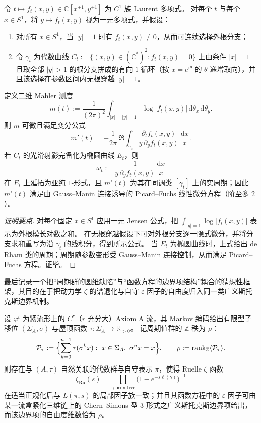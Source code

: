 \begin{theorem}\label{thm:conclusion-leyang-jensen-stokes-variational}
令 \(t\mapsto f_t(x,y)\in\mathbb C[x^{\pm1},y^{\pm1}]\) 为 \(C^1\) 族 Laurent 多项式。
对每个 \(t\) 与每个 \(x\in S^1\)，将 \(y\mapsto f_t(x,y)\) 视为一元多项式，并假设：
\begin{enumerate}
  \item 对所有 \(x\in S^1\)，当 \(|y|=1\) 时有 \(f_t(x,y)\neq 0\)，从而可连续选择外根分支；
  \item 令 \(\gamma_t\) 为代数曲线 \(C_t:=\{(x,y)\in(\mathbb C^*)^2:f_t(x,y)=0\}\) 上由条件 \(|x|=1\) 且取全部 \(|y|>1\) 的根分支拼成的有向 \(1\)-循环（按 \(x=e^{\mathrm i\theta}\) 的 \(\theta\) 递增取向），并且该选择在参数区间内无根穿越 \(|y|=1\)。
\end{enumerate}
定义二维 Mahler 测度
\[
m(t):=\frac1{(2\pi)^2}\int_{|x|=|y|=1}\log|f_t(x,y)|\,\mathrm d\theta_x\,\mathrm d\theta_y.
\]
则 \(m\) 可微且满足变分公式
\[
m'(t)
=-\frac1{2\pi}\,\Re\int_{\gamma_t}\frac{\partial_t f_t(x,y)}{y\,\partial_y f_t(x,y)}\,\frac{\mathrm d x}{x}.
\]
若 \(C_t\) 的光滑射影完备化为椭圆曲线 \(E_t\)，则
\[
\omega_t:=\frac{1}{y\,\partial_y f_t(x,y)}\,\frac{\mathrm d x}{x}
\]
在 \(E_t\) 上延拓为亚纯 \(1\)-形式，且 \(m'(t)\) 为其在同调类 \([\gamma_t]\) 上的实周期；因此 \(m'(t)\) 满足由 Gauss--Manin 连接诱导的 Picard--Fuchs 线性微分方程（阶至多 \(2\)）。
\end{theorem}
\begin{proof}[证明要点]
对每个固定 \(x\in S^1\) 应用一元 Jensen 公式，把 \(\int_{|y|=1}\log|f_t(x,y)|\) 表示为外根模长对数之和。
在无根穿越假设下可对外根分支逐一隐式微分，并将分支求和重写为沿 \(\gamma_t\) 的线积分，得到所示公式。
当 \(E_t\) 为椭圆曲线时，上式给出 de Rham 类的周期；周期随参数变形受 Gauss--Manin 连接控制，从而满足 Picard--Fuchs 方程。证毕。
\end{proof}

最后记录一个把“周期群的圆维缺陷”与“函数方程的边界项结构”耦合的猜想性框架，其目的在于把动力学 \(\zeta\) 的谱退化与自守 \(\varepsilon\)-因子的自由度归入同一类广义斯托克斯边界机制。

\begin{conjecture}\label{conj:conclusion-stokes-boundary-langlands-bridge}
设 \(\varphi^t\) 为紧流形上的 \(C^r\)（\(r\) 充分大）Axiom A 流，其 Markov 编码给出有限型子移位 \((\Sigma_A,\sigma)\) 与屋顶函数 \(\tau:\Sigma_A\to\mathbb R_{>0}\)。
记周期值群的 \(\mathbb Z\)-秩为 \(\rho\)：
\[
\mathcal P_\tau:=\Bigl\{\sum_{k=0}^{n-1}\tau(\sigma^k x):\ x\in\Sigma_A,\ \sigma^n x=x\Bigr\},
\qquad
\rho:=\operatorname{rank}_{\mathbb Z}\langle \mathcal P_\tau\rangle.
\]
则存在与 \((A,\tau)\) 自然关联的代数群与自守表示 \(\pi\)，使得 Ruelle \(\zeta\) 函数
\[
\zeta_{\mathrm{Ru}}(s)=\prod_{\gamma\ \mathrm{primitive}}\bigl(1-e^{-s\ell(\gamma)}\bigr)^{-1}
\]
在适当正规化后与 \(L(\pi,s)\) 的局部因子族一致；并且其函数方程中的 \(\varepsilon\)-因子可由某一流盒紧化三维链上的 Chern--Simons 型 \(3\)-形式之广义斯托克斯边界项给出，而该边界项的自由度维数恰为 \(\rho\)。
\end{conjecture}

